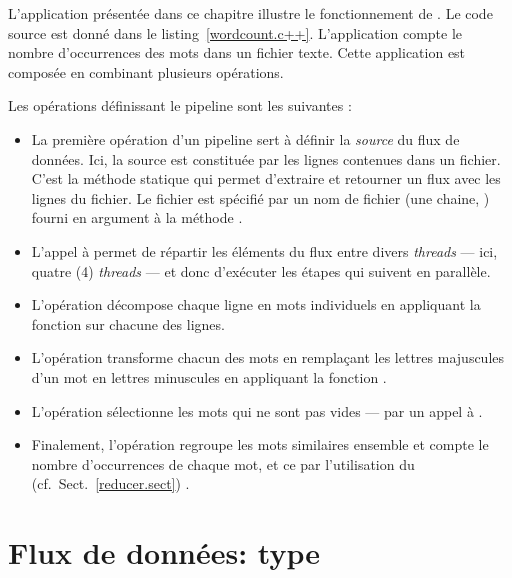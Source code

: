L'application  pr\'esent\'ee dans ce chapitre illustre le fonctionnement de . Le code source est donn\'e dans le listing~\ref{wordcount.c++}. L'application compte le nombre d'occurrences des mots dans un fichier texte. Cette application est compos\'ee en combinant plusieurs op\'erations.



\goodbreak
Les op\'erations d\'efinissant le pipeline sont les suivantes :
\begin{itemize}

\item  La premi\`ere op\'eration d'un pipeline sert \`a d\'efinir la \emph{source} du flux de donn\'ees. Ici, la source est
constitu\'ee par les lignes contenues dans un fichier. C'est la
m\'ethode statique  qui permet d'extraire et retourner un
flux avec les lignes du fichier. Le fichier est sp\'ecifi\'e par un nom de fichier
(une chaine, ) fourni en argument \`a la m\'ethode
.


\item L'appel \`a  permet de r\'epartir les \'el\'ements du flux entre divers \emph{threads} --- ici, quatre (4) \emph{threads} --- et donc d'ex\'ecuter les \'etapes qui suivent en parall\`ele. 



\item L'op\'eration  d\'ecompose chaque ligne en mots individuels en appliquant la fonction  sur chacune des lignes.

\item L'op\'eration  transforme chacun des mots en rempla\c{c}ant les lettres majuscules d'un mot en lettres minuscules en appliquant la fonction .

\item L'op\'eration  s\'electionne les mots qui ne sont pas vides --- par un appel \`a .

\item Finalement, l'op\'eration   regroupe les mots similaires ensemble et compte le nombre d'occurrences de chaque mot, et ce par l'utilisation du  (cf.~Sect.~\ref{reducer.sect}) . 
\end{itemize}


\section{Flux de donn\'ees: type }

